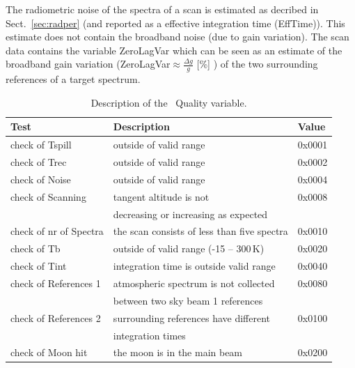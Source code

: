 The radiometric noise of the spectra of a scan is estimated as decribed  
in Sect.~\ref{sec:radper} (and reported as a effective integration time (EffTime)).
This estimate does not contain the broadband noise (due to gain variation). 
The scan data contains the variable ZeroLagVar which can be seen as an estimate
of the broadband gain variation (ZeroLagVar\(\approx \frac{\Delta g}{g}\) [\%] ) 
of the two surrounding references of a target spectrum. 
 

\begin{table}
\caption{ Description of the \smr\ Quality variable. }
\label{table:quality}
\begin{tabular}{|l|l|l|}
  \hline
  \textbf{Test} & \textbf{Description} & \textbf{Value} \\
  \hline
  check of Tspill   & outside of valid range  & 0x0001 \\
  \hline
  check of Trec     & outside of valid range & 0x0002  \\
  \hline
  check of Noise    & outside of valid range & 0x0004  \\
  \hline
  check of Scanning & tangent altitude is not & 0x0008 \\
                    &  decreasing or increasing as expected &  \\
  \hline
  check of nr of Spectra &  the scan consists of less than five spectra & 0x0010\\
  \hline
  check of Tb       & outside of valid range (-15 -- 300\,K) & 0x0020\\ 
  \hline
  check of Tint     & integration time is outside valid range & 0x0040\\
  \hline
  check of References 1 & atmospheric spectrum is not collected & 0x0080\\
                        & between two sky beam 1 references     & \\
  \hline
  check of References 2 & surrounding references have different & 0x0100\\
                        & integration times                     & \\ 
  \hline check of Moon hit   & the moon is in the main beam          & 0x0200 \\

\hline
\end{tabular}
\end{table}


